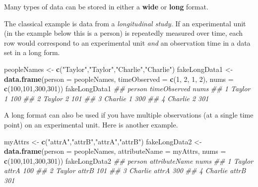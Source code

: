 \documentclass[12pt,krantz2]{krantz}
\makeatletter
\newenvironment{Shaded}{\begin{snugshade}}{\end{snugshade}}
\newcommand{\CommentTok}[1]{\textcolor[rgb]{0.37,0.37,0.37}{\textit{#1}}}
\newcommand{\DataTypeTok}[1]{\textcolor[rgb]{0.27,0.27,0.27}{#1}}
\newcommand{\DecValTok}[1]{\textcolor[rgb]{0.06,0.06,0.06}{#1}}
\newcommand{\KeywordTok}[1]{\textcolor[rgb]{0.27,0.27,0.27}{\textbf{#1}}}
\newcommand{\NormalTok}[1]{#1}
\newcommand{\StringTok}[1]{\textcolor[rgb]{0.5,0.5,0.5}{#1}}
\newenvironment{kframe}{%
\medskip{}
\setlength{\fboxsep}{.8em}
 \def\at@end@of@kframe{}%
 \ifinner\ifhmode%
  \def\at@end@of@kframe{\end{minipage}}%
  \begin{minipage}{\columnwidth}%
 \fi\fi%
 \def\FrameCommand##1{\hskip\@totalleftmargin \hskip-\fboxsep
 \colorbox{shadecolor}{##1}\hskip-\fboxsep
     \hskip-\linewidth \hskip-\@totalleftmargin \hskip\columnwidth}%
 \MakeFramed {\advance\hsize-\width
   \@totalleftmargin\z@ \linewidth\hsize
   \@setminipage}}%
 {\par\unskip\endMakeFramed%
 \at@end@of@kframe}
\renewenvironment{Shaded}{\begin{kframe}}{\end{kframe}}
\makeatother
\begin{document}
Many types of data can be stored in either a \textbf{wide} or \textbf{long} format.

The classical example is data from a \emph{longitudinal study.} If an experimental unit (in the example below this is a person) is repeatedly measured over time, each row would correspond to an experimental unit \emph{and} an observation time in a data set in a long form.

\begin{Shaded}
\begin{Highlighting}[]
\NormalTok{peopleNames <-}\StringTok{ }\KeywordTok{c}\NormalTok{(}\StringTok{"Taylor"}\NormalTok{,}\StringTok{"Taylor"}\NormalTok{,}\StringTok{"Charlie"}\NormalTok{,}\StringTok{"Charlie"}\NormalTok{)}
\NormalTok{fakeLongData1 <-}\StringTok{ }\KeywordTok{data.frame}\NormalTok{(}\DataTypeTok{person =}\NormalTok{ peopleNames, }
                             \DataTypeTok{timeObserved =} \KeywordTok{c}\NormalTok{(}\DecValTok{1}\NormalTok{, }\DecValTok{2}\NormalTok{, }\DecValTok{1}\NormalTok{, }\DecValTok{2}\NormalTok{),}
                             \DataTypeTok{nums =} \KeywordTok{c}\NormalTok{(}\DecValTok{100}\NormalTok{,}\DecValTok{101}\NormalTok{,}\DecValTok{300}\NormalTok{,}\DecValTok{301}\NormalTok{))}
\NormalTok{fakeLongData1}
\CommentTok{##    person timeObserved nums}
\CommentTok{## 1  Taylor            1  100}
\CommentTok{## 2  Taylor            2  101}
\CommentTok{## 3 Charlie            1  300}
\CommentTok{## 4 Charlie            2  301}
\end{Highlighting}
\end{Shaded}

A long format can also be used if you have multiple observations (at a single time point) on an experimental unit. Here is another example.

\begin{Shaded}
\begin{Highlighting}[]
\NormalTok{myAttrs <-}\StringTok{ }\KeywordTok{c}\NormalTok{(}\StringTok{"attrA"}\NormalTok{,}\StringTok{"attrB"}\NormalTok{,}\StringTok{"attrA"}\NormalTok{,}\StringTok{"attrB"}\NormalTok{)}
\NormalTok{fakeLongData2 <-}\StringTok{ }\KeywordTok{data.frame}\NormalTok{(}\DataTypeTok{person =}\NormalTok{ peopleNames, }
                             \DataTypeTok{attributeName =}\NormalTok{ myAttrs,}
                             \DataTypeTok{nums =} \KeywordTok{c}\NormalTok{(}\DecValTok{100}\NormalTok{,}\DecValTok{101}\NormalTok{,}\DecValTok{300}\NormalTok{,}\DecValTok{301}\NormalTok{))}
\NormalTok{fakeLongData2}
\CommentTok{##    person attributeName nums}
\CommentTok{## 1  Taylor         attrA  100}
\CommentTok{## 2  Taylor         attrB  101}
\CommentTok{## 3 Charlie         attrA  300}
\CommentTok{## 4 Charlie         attrB  301}
\end{Highlighting}
\end{Shaded}
\end{document}
